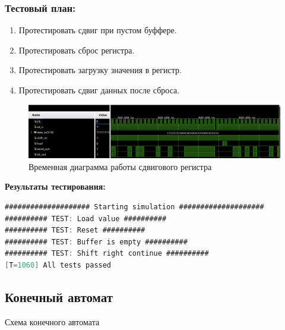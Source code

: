 \documentclass[12pt,onecolumn]{article}
\begin{document}
\subsubsection{Тестовый план:}
\begin{enumerate}
  \item Протестировать сдвиг при пустом буффере.
  \item Протестировать сброс регистра.
  \item Протестировать загрузку значения в регистр.
  \item Протестировать сдвиг данных после сброса.
\end{enumerate}
\begin{figure}[H]
  \centering
  \includegraphics[width=\textwidth]{image/shift-right-diagram.png}
  \caption{Временная диаграмма работы сдвигового регистра}
\end{figure}

\textbf{Результаты тестирования:}
\begin{lstlisting}[language=verilog]
#################### Starting simulation ####################
########## TEST: Load value ##########
########## TEST: Reset ##########
########## TEST: Buffer is empty ##########
########## TEST: Shift right continue ##########
[T=1060] All tests passed
\end{lstlisting}
 
\subsection{Конечный автомат}

Схема конечного автомата
\end{document}
